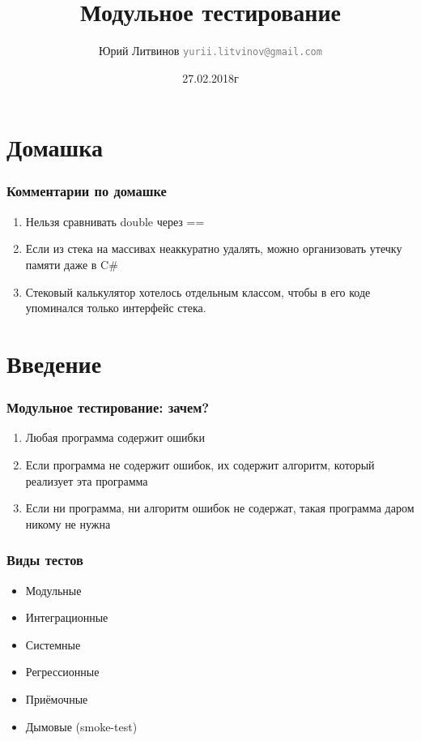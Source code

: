 \documentclass[xetex,mathserif,serif]{beamer}
\title{Модульное тестирование}
\author[Юрий Литвинов]{Юрий Литвинов \newline \textcolor{gray}{\small\texttt{yurii.litvinov@gmail.com}}}
\date{27.02.2018г}
\begin{document}
	
	\frame{\titlepage}

	\section{Домашка}

	\begin{frame}
		\frametitle{Комментарии по домашке}
		\begin{enumerate}
			\item Нельзя сравнивать double через ==
			\item Если из стека на массивах неаккуратно удалять, можно организовать утечку памяти даже в C\#
			\item Стековый калькулятор хотелось отдельным классом, чтобы в его коде упоминался только интерфейс стека.
		\end{enumerate}
	\end{frame}

	\section{Введение}

	\begin{frame}
		\frametitle{Модульное тестирование: зачем?}
		\begin{enumerate}
			\item Любая программа содержит ошибки
			\item Если программа не содержит ошибок, их содержит алгоритм, который реализует эта программа
			\item Если ни программа, ни алгоритм ошибок не содержат, такая программа даром никому не нужна
		\end{enumerate}
	\end{frame}

	\begin{frame}
		\frametitle{Виды тестов}
		\begin{itemize}
			\item Модульные
			\item Интеграционные
			\item Системные
		\end{itemize}
		\vspace{3mm}
		\begin{itemize}
			\item Регрессионные
			\item Приёмочные
			\item Дымовые (smoke-test)
		\end{itemize}
	\end{frame}
\end{document}
